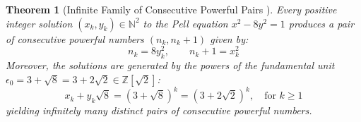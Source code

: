 \documentclass[11pt,a4paper]{article}
\newtheorem{theorem}{Theorem}[section]
\theoremstyle{definition}
\begin{document}
\begin{theorem}[Infinite Family of Consecutive Powerful Pairs \cite{walker1976}]\label{thm:infinite_pairs}
Every positive integer solution $(x_k, y_k) \in \mathbb{N}^2$ to the Pell equation $x^2 - 8y^2 = 1$ produces a pair of consecutive powerful numbers $(n_k, n_k + 1)$ given by:
\begin{equation}\label{eq:pair_formula}
n_k = 8 y_k^2, \qquad n_k + 1 = x_k^2
\end{equation}
Moreover, the solutions are generated by the powers of the fundamental unit $\epsilon_0 = 3 + \sqrt{8} = 3 + 2\sqrt{2} \in \mathbb{Z}[\sqrt{2}]$:
\begin{equation}\label{eq:unit_gen}
x_k + y_k \sqrt{8} = (3 + \sqrt{8})^k = (3 + 2\sqrt{2})^k, \quad \text{for } k \ge 1
\end{equation}
yielding infinitely many distinct pairs of consecutive powerful numbers.
\end{theorem}
\end{document}
